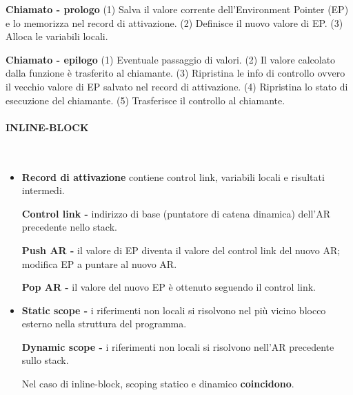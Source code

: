 \documentclass[a4paper, 12pt]{article}
\begin{document}
\textbf{Chiamato - prologo} (1) Salva il valore corrente dell'Environment Pointer (EP) e lo
memorizza nel record di attivazione. (2) Definisce il nuovo valore di EP. (3) Alloca le
variabili locali.

\textbf{Chiamato - epilogo} (1) Eventuale passaggio di valori. (2) Il valore calcolato
dalla funzione è trasferito al chiamante. (3) Ripristina le info di controllo ovvero il
vecchio valore di EP salvato nel record di attivazione. (4) Ripristina lo stato di
esecuzione del chiamante. (5) Trasferisce il controllo al chiamante. 

\paragraph{INLINE-BLOCK} \
\begin{itemize}
    \item \textbf{Record di attivazione}
    contiene control link, variabili locali e risultati intermedi.

    \textbf{Control link -} indirizzo di base (puntatore di catena dinamica) dell'AR
    precedente nello stack.

    \textbf{Push AR -} il valore di EP diventa il valore del control link del nuovo AR;
    modifica EP a puntare al nuovo AR.

    \textbf{Pop AR -} il valore del nuovo EP è ottenuto seguendo il control link.
    \item \textbf{Static scope -} i riferimenti non locali si risolvono nel più vicino
    blocco esterno nella struttura del programma.
    
    \textbf{Dynamic scope -} i riferimenti non locali si risolvono nell'AR precedente sullo
    stack.
    
    Nel caso di inline-block, scoping statico e dinamico \textbf{coincidono}.
\end{itemize}
\end{document}
